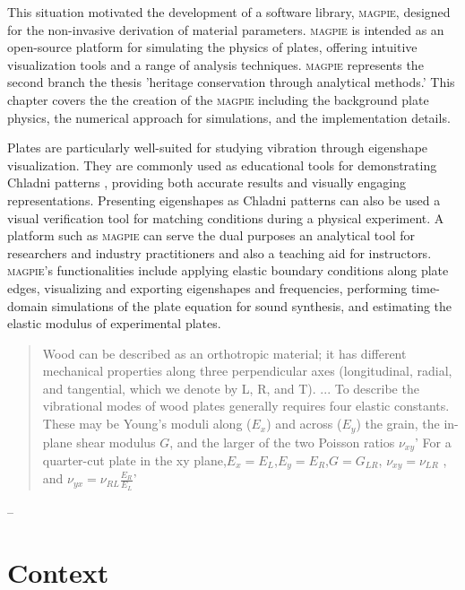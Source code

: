 This situation motivated the development of a software library, \textsc{magpie}, designed for the non-invasive derivation of material parameters. \textsc{magpie} is intended as an open-source platform for simulating the physics of plates, offering intuitive visualization tools and a range of analysis techniques. \textsc{magpie} represents the second branch the thesis 'heritage conservation through analytical methods.' This chapter covers the the creation of the \textsc{magpie} including the background plate physics, the numerical approach for simulations, and the implementation details. 

Plates are particularly well-suited for studying vibration through eigenshape visualization. They are commonly used as educational tools for demonstrating Chladni patterns \cite{chladni_treatise_2015}, providing both accurate results and visually engaging representations. Presenting eigenshapes as Chladni patterns can also be used a visual verification tool for matching conditions during a physical experiment. A platform such as \textsc{magpie} can serve the dual purposes an analytical tool for researchers and industry practitioners and also a teaching aid for instructors. \textsc{magpie}'s functionalities include applying elastic boundary conditions along plate edges, visualizing and exporting eigenshapes and frequencies, performing time-domain simulations of the plate equation for sound synthesis, and estimating the elastic modulus of experimental plates. 


\begin{quotation}
Wood can be described as an orthotropic material; it has different mechanical properties along three perpendicular axes (longitudinal, radial, and tangential, which we denote by L, R, and T).
...
To describe the vibrational modes of wood plates generally requires four elastic constants. These may be Young's moduli along ($E_x$) and across ($E_y$) the grain, the in-plane shear modulus $G$, and the larger of the two Poisson ratios $\nu_{xy}$' For a quarter-cut plate in the xy plane,$E_x= E_L$,$E_y= E_R$,$G= G_{LR}$, $\nu_{xy} = \nu_{LR}$ , and $\nu_{yx} = \nu_{RL}\frac{E_R}{E_L}$' 
\end{quotation}
-- \cite[Rectangular Wood Plates][Section 3.11]{fletcher_physics_2012}



\section{Context}

